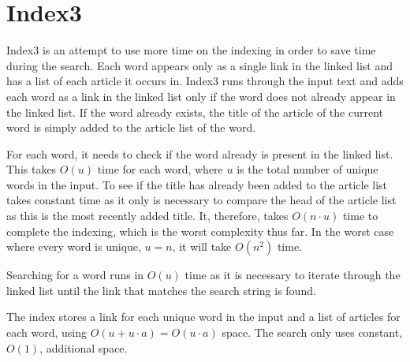 \section{Index3}
\label{section:Index3}

Index3 is an attempt to use more time on the indexing in order to save time during the search. Each word appears only as a single link in the linked list and has a list of each article it occurs in. Index3 runs through the input text and adds each word as a link in the linked list only if the word does not already appear in the linked list. If the word already exists, the title of the article of the current word is simply added to the article list of the word.

For each word, it needs to check if the word already is present in the linked list. This takes $O(u)$ time for each word, where $u$ is the total number of unique words in the input. To see if the title has already been added to the article list takes constant time as it only is necessary to compare the head of the article list as this is the most recently added title. It, therefore, takes $O(n\cdot u)$ time to complete the indexing, which is the worst complexity thus far. In the worst case where every word is unique, $u=n$, it will take $O(n^2)$ time. 

Searching for a word runs in $O(u)$ time as it is necessary to iterate through the linked list until the link that matches the search string is found. 

The index stores a link for each unique word in the input and a list of articles for each word, using $O(u + u\cdot a) = O(u\cdot a)$ space. The search only uses constant, $O(1)$, additional space. 
